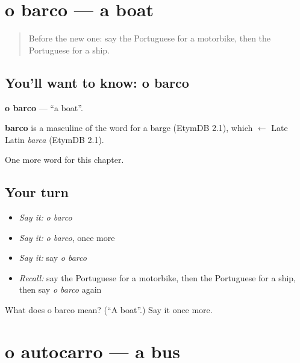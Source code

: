 \section[o barco]{o barco — a boat}

\label{lesson:PT-C92-barco}



\begin{quote}
Before the new one: say the Portuguese for a motorbike, then the Portuguese for a ship.
\end{quote}

\subsection*{You'll want to know: o barco}
\textbf{o barco} — \textquotedblleft{}a boat\textquotedblright{}.

\begin{cousinweb}
\textbf{barco} is a masculine of the word for a barge (EtymDB 2.1), which $\leftarrow$ Late Latin \emph{barca} (EtymDB 2.1).
\end{cousinweb}

\begin{grammarlens}[title={What you've built}]
One more word for this chapter.
\end{grammarlens}

\subsection*{Your turn}
\begin{itemize}
\raggedright
  \item \emph{Say it:} \emph{o barco}
  \item \emph{Say it:} \emph{o barco}, once more
  \item \emph{Say it:} say \emph{o barco}
  \item \emph{Recall:} say the Portuguese for a motorbike, then the Portuguese for a ship, then say \emph{o barco} again
\end{itemize}

\begin{tcolorbox}[breakable,colback=teal!4,colframe=teal!35!black,title={Before you move on}]
What does o barco mean? (\textquotedblleft{}A boat\textquotedblright{}.) Say it once more.
\end{tcolorbox}
\section[o autocarro]{o autocarro — a bus}

